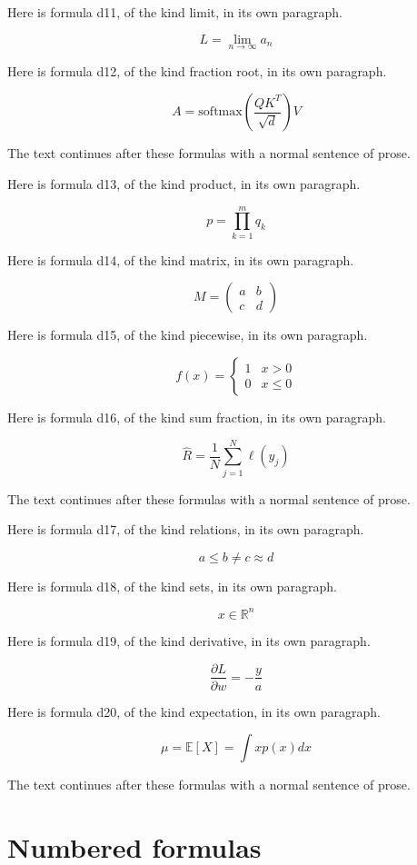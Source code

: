 \documentclass[11pt]{article}
\begin{document}
Here is formula d11, of the kind limit, in its own paragraph.

\[ L = \lim_{n \to \infty} a_{n} \]

Here is formula d12, of the kind fraction root, in its own paragraph.

\[ A = \mathrm{softmax} ( \frac{Q K^{T}}{\sqrt{d}} ) V \]

The text continues after these formulas with a normal sentence of prose.


Here is formula d13, of the kind product, in its own paragraph.

\[ p = \prod_{k = 1}^{m} q_{k} \]

Here is formula d14, of the kind matrix, in its own paragraph.

\[ M = \begin{pmatrix} a & b \\ c & d \end{pmatrix} \]

Here is formula d15, of the kind piecewise, in its own paragraph.

\[ f ( x ) = \begin{cases} 1 & x > 0 \\ 0 & x \le 0 \end{cases} \]

Here is formula d16, of the kind sum fraction, in its own paragraph.

\[ \hat{R} = \frac{1}{N} \sum_{j = 1}^{N} \ell ( y_{j} ) \]

The text continues after these formulas with a normal sentence of prose.


Here is formula d17, of the kind relations, in its own paragraph.

\[ a \le b \ne c \approx d \]

Here is formula d18, of the kind sets, in its own paragraph.

\[ x \in \mathbb{R}^{n} \]

Here is formula d19, of the kind derivative, in its own paragraph.

\[ \frac{\partial L}{\partial w} = - \frac{y}{a} \]

Here is formula d20, of the kind expectation, in its own paragraph.

\[ \mu = \mathbb{E} [ X ] = \int x p ( x ) d x \]

The text continues after these formulas with a normal sentence of prose.


\section{Numbered formulas}
\end{document}
